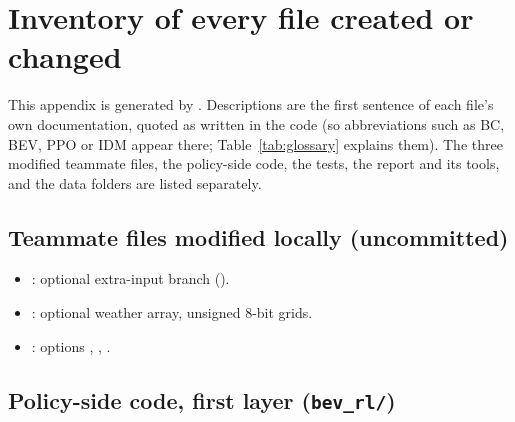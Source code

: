 \section{Inventory of every file created or changed}\label{app:inventory}
This appendix is generated by . Descriptions are the first sentence of each file's own documentation, quoted as written in the code (so abbreviations such as BC, BEV, PPO or IDM appear there; Table~\ref{tab:glossary} explains them). The three modified teammate files, the policy-side code, the tests, the report and its tools, and the data folders are listed separately.
\subsection{Teammate files modified locally (uncommitted)}\begin{itemize}\item {}: optional extra-input branch (). \item {}: optional weather array, unsigned 8-bit grids. \item {}: options , , .\end{itemize}
\subsection{Policy-side code, first layer (\texttt{bev\_rl/})}

